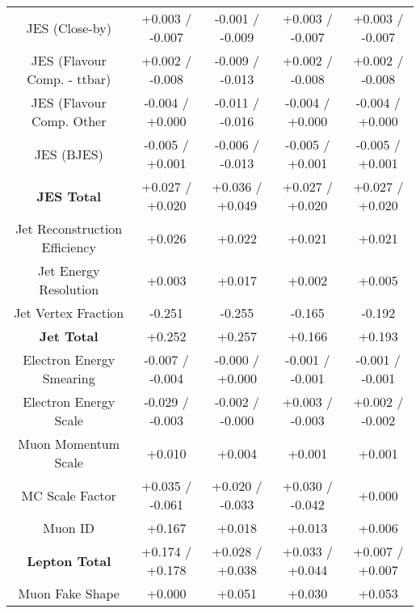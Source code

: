 \begin{table}[htbp]
\begin{center}
\begin{tabular}{|c|c|c|c|c|}
JES (Close-by)                        &+0.003   / -0.007   & -0.001   / -0.009   & +0.003   / -0.007   & +0.003   / -0.007  \\
JES (Flavour Comp. - ttbar)           &+0.002   / -0.008   & -0.009   / -0.013   & +0.002   / -0.008   & +0.002   / -0.008  \\
JES (Flavour Comp. Other              &-0.004   / +0.000   & -0.011   / -0.016   & -0.004   / +0.000   & -0.004   / +0.000  \\
JES (BJES)                            &-0.005   / +0.001   & -0.006   / -0.013   & -0.005   / +0.001   & -0.005   / +0.001  \\
\hline
\textbf{JES Total}                    &+0.027   / +0.020   & +0.036   / +0.049   & +0.027   / +0.020   & +0.027   / +0.020  \\
\hline
Jet Reconstruction Efficiency         &+0.026              & +0.022              & +0.021              & +0.021             \\
Jet Energy Resolution                 &+0.003              & +0.017              & +0.002              & +0.005             \\
Jet Vertex Fraction                   &-0.251              & -0.255              & -0.165              & -0.192             \\
\hline
\textbf{Jet Total}                    &+0.252              & +0.257              & +0.166              & +0.193             \\
\hline
Electron Energy Smearing              &-0.007   / -0.004   & -0.000   / +0.000   & -0.001   / -0.001   & -0.001   / -0.001  \\
Electron Energy Scale                 &-0.029   / -0.003   & -0.002   / -0.000   & +0.003   / -0.003   & +0.002   / -0.002  \\
Muon Momentum Scale                   &+0.010              & +0.004              & +0.001              & +0.001             \\
MC Scale Factor                       &+0.035   / -0.061   & +0.020   / -0.033   & +0.030   / -0.042   & +0.000             \\
Muon ID                               &+0.167              & +0.018              & +0.013              & +0.006             \\
\hline
\textbf{Lepton Total}                 &+0.174   / +0.178   & +0.028   / +0.038   & +0.033   / +0.044   & +0.007   / +0.007  \\
\hline
Muon Fake Shape                       &+0.000              & +0.051              & +0.030              & +0.053             \\

\end{tabular}
\end{center}
\end{table}
